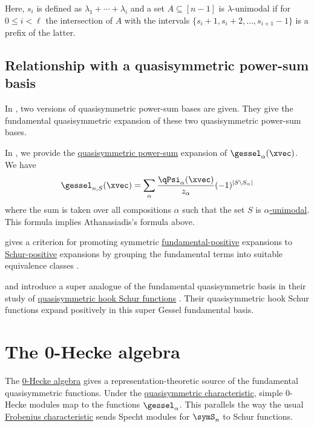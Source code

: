 Here, $s_i$ is defined as $\lambda_1+\dotsb + \lambda_{i}$
and a set $A \subseteq [n-1]$ is $\lambda$-unimodal if for $0\leq i \lt \ell$
the intersection of $A$ with the intervals
$\{s_i+1,s_i+2,\dotsc,s_{i+1}-1\}$
is a prefix of the latter.


\subsection[gesselQuasiPowerSum]{Relationship with a quasisymmetric power-sum basis}

In \cite{BallantineDaughertyHicksMason2020}, two versions of quasisymmetric
power-sum bases are given.
They give the fundamental quasisymmetric expansion of these two quasisymmetric
power-sum bases.

In \cite{AlexanderssonSulzgruber2019}, we provide the
\hyperref[qPsi]{quasisymmetric power-sum} expansion of $\gessel_\alpha(\xvec)$.
We have
\begin{equation*}
\gessel_{n,S}(\xvec) =
\sum_{\alpha} \frac{\qPsi_\alpha(\xvec)}{z_\alpha}
(-1)^{|S\setminus S_\alpha|}
\end{equation*}
where the sum is taken over all compositions $\alpha$ such that the set $S$ is
\hyperref[lambdaUnimodalSubset]{$\alpha$-unimodal}.
This formula implies Athanasiadis's formula above.


 gives a criterion for promoting symmetric
\hyperref[gessel]{fundamental-positive} expansions to
\hyperref[schurPositivity]{Schur-positive} expansions by grouping the
fundamental terms into suitable equivalence classes \cite{Roberts2016}.

 and  introduce a super analogue
of the fundamental quasisymmetric basis in their study of
\hyperref[hookSchur]{quasisymmetric hook Schur functions}
\cite{MasonNiese2018}.  Their quasisymmetric hook Schur functions expand
positively in this super Gessel fundamental basis.


\section[gesselZeroHeckeAlgebra]{The 0-Hecke algebra}

The \hyperref[zeroHeckeAlgebra]{0-Hecke algebra} gives a representation-theoretic
source of the fundamental quasisymmetric functions.  Under the
\hyperref[quasisymmetricCharacteristic]{quasisymmetric characteristic},
simple $0$-Hecke modules map to the functions $\gessel_\alpha$.
This parallels the way the usual
\hyperref[frobeniusCharacteristic]{Frobenius characteristic} sends Specht
modules for $\symS_n$ to Schur functions.
